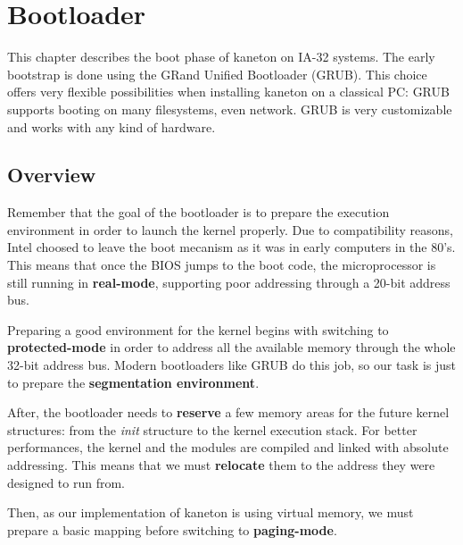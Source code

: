 
%
%

\chapter{Bootloader}

This chapter describes the boot phase of kaneton on IA-32 systems. The
early bootstrap is done using the GRand Unified Bootloader
(GRUB). This choice offers very flexible possibilities when installing
kaneton on a classical PC: GRUB supports booting on many filesystems,
even network. GRUB is very customizable and works with any kind of
hardware.

\newpage

%
%

\section{Overview}

Remember that the goal of the bootloader is to prepare the execution
environment in order to launch the kernel properly. Due to
compatibility reasons, Intel choosed to leave the boot mecanism as it
was in early computers in the 80's. This means that once the BIOS
jumps to the boot code, the microprocessor is still running in
\textbf{real-mode}, supporting poor addressing through a 20-bit
address bus.

Preparing a good environment for the kernel begins with switching to
\textbf{protected-mode} in order to address all the available memory
through the whole 32-bit address bus. Modern bootloaders like GRUB do
this job, so our task is just to prepare the \textbf{segmentation
environment}.

After, the bootloader needs to \textbf{reserve} a few memory areas for
the future kernel structures: from the \textit{init} structure to the
kernel execution stack. For better performances, the kernel and the
modules are compiled and linked with absolute addressing. This means
that we must \textbf{relocate} them to the address they were designed
to run from.

Then, as our implementation of kaneton is using virtual memory, we
must prepare a basic mapping before switching to \textbf{paging-mode}.

